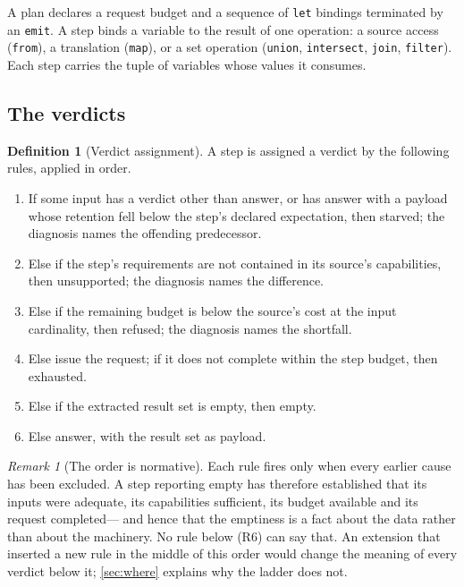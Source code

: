 \documentclass[11pt,twocolumn,a4paper]{article}
\theoremstyle{plain}
\theoremstyle{definition}
\newtheorem{definition}[theorem]{Definition}
\theoremstyle{remark}
\newtheorem{remark}[theorem]{Remark}
\newcommand{\vans}{\textsf{answer}}
\newcommand{\vempty}{\textsf{empty}}
\newcommand{\vsurf}{\textsf{unsupported}}
\newcommand{\vtime}{\textsf{exhausted}}
\newcommand{\vref}{\textsf{refused}}
\newcommand{\vstarve}{\textsf{starved}}
\newcommand{\hfq}[1]{\texttt{#1}}
\begin{document}
A plan declares a request budget and a sequence of \hfq{let} bindings
terminated by an \hfq{emit}. A step binds a variable to the result of one
operation: a source access (\hfq{from}), a translation (\hfq{map}), or a set
operation (\hfq{union}, \hfq{intersect}, \hfq{join}, \hfq{filter}). Each step
carries the tuple of variables whose values it consumes.

\subsection{The verdicts}

\begin{definition}[Verdict assignment]
\label{def:verdicts}
A step is assigned a verdict by the following rules, applied in order.
\begin{enumerate}[label=(R\arabic*),leftmargin=3.2em,itemsep=0.2em]
\item If some input has a verdict other than \vans, or has \vans{} with a
payload whose retention fell below the step's declared expectation, then
\vstarve; the diagnosis names the offending predecessor.
\item Else if the step's requirements are not contained in its source's
capabilities, then \vsurf; the diagnosis names the difference.
\item Else if the remaining budget is below the source's cost at the input
cardinality, then \vref; the diagnosis names the shortfall.
\item Else issue the request; if it does not complete within the step budget,
then \vtime.
\item Else if the extracted result set is empty, then \vempty.
\item Else \vans, with the result set as payload.
\end{enumerate}
\end{definition}

\begin{remark}[The order is normative]
\label{rem:order}
Each rule fires only when every earlier cause has been excluded. A step
reporting \vempty{} has therefore established that its inputs were adequate,
its capabilities sufficient, its budget available and its request completed---
and hence that the emptiness is a fact about the data rather than about the
machinery. No rule below (R6) can say that. An extension that inserted a new
rule in the middle of this order would change the meaning of every verdict
below it; \cref{sec:where} explains why the ladder does not.
\end{remark}
\end{document}
